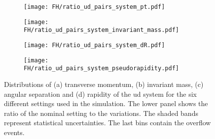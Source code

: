 \begin{figure}[H]
    \centering
    \begin{subfigure}{0.49\textwidth}
        \centering
        \texttt{[image: FH/ratio\_ud\_pairs\_system\_pt.pdf]}
        \caption{}
        \label{app:subfig:pt(ud)_FH}
    \end{subfigure}
    \begin{subfigure}{0.49\textwidth}
        \centering
        \texttt{[image: FH/ratio\_ud\_pairs\_system\_invariant\_mass.pdf]}
        \caption{}
        \label{app:subfig:m(ud)_FH}
    \end{subfigure}

    \vspace{0.2cm}
    
    \begin{subfigure}{0.49\textwidth}
        \centering
        \texttt{[image: FH/ratio\_ud\_pairs\_system\_dR.pdf]}
        \caption{}
        \label{app:subfig:dR(ud)_FH}
    \end{subfigure}
    \begin{subfigure}{0.49\textwidth}
        \centering
        \texttt{[image: FH/ratio\_ud\_pairs\_system\_pseudorapidity.pdf]}
        \caption{}
        \label{app:subfig:y(ud)_FH}
    \end{subfigure}
    \caption{Distributions of (a) transverse momentum, (b) invariant mass,  (c) angular separation and (d) rapidity of the ud system for the six different settings used in the simulation. The lower panel shows the ratio of the nominal setting to the variations. The shaded bands represent statistical uncertainties. The last bins contain the overflow events.}
    \label{app:fig:ud_FH}
\end{figure}

